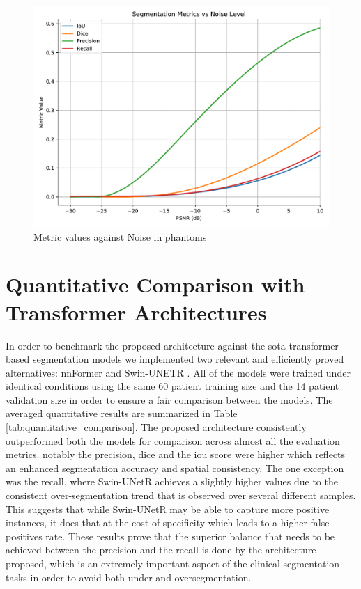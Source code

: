 \begin{figure}[htb!] %
\centering
\centering
\includegraphics[width=1\textwidth]{images/metrics_vs_noise_cubic.pdf}
\caption{\centering Metric values against Noise in phantoms}
\label{Fig:noise}
\end{figure}

\section{Quantitative Comparison with Transformer Architectures}
In order to benchmark the proposed architecture against the \gls{sota} transformer based segmentation models we implemented two relevant and efficiently proved alternatives: nnFormer \cite{zhou2023nnformer} and Swin-UNETR \cite{10.1007/978-3-031-08999-2_22}. All of the models were trained under identical conditions using the same 60 patient training size and the 14 patient validation size in order to ensure a fair comparison between the models. The averaged quantitative results are summarized in Table \ref{tab:quantitative_comparison}. The proposed architecture consistently outperformed both the models for comparison across almost all the evaluation metrics. notably the precision, dice and the \gls{iou} score were higher which reflects an enhanced segmentation accuracy and spatial consistency. The one exception was the recall, where Swin-UNetR achieves a slightly higher values due to the consistent over-segmentation trend that is observed over several different samples. This suggests that while Swin-UNetR may be able to capture more positive instances, it does that at the cost of specificity which leads to a higher false positives rate. These results prove that the superior balance that needs to be achieved between the precision and the recall is done by the architecture proposed, which is an extremely important aspect of the clinical segmentation tasks in order to avoid both under and oversegmentation.

